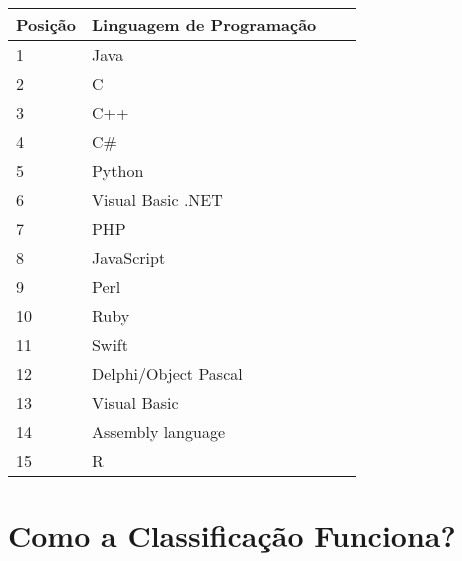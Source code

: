 \documentclass[
    12pt,               %
    openany,            %
    twoside,            %
    a4paper,            %
    brazil              %
    ]{abntex2}
\begin{document}
\begin{center}
\begin{tabular}{ | l | l | l | p{5cm} |}
\hline
Posição & Linguagem de Programação \\ \hline
1 & Java \\ \hline
2 & C \\ \hline
3 & C++ \\ \hline
4 & C\# \\ \hline
5 & Python \\ \hline
6 & Visual Basic .NET \\ \hline
7 & PHP \\ \hline
8 & JavaScript \\ \hline
9 & Perl \\ \hline
10 & Ruby \\ \hline
11 & Swift \\ \hline
12 & Delphi/Object Pascal \\ \hline
13 & Visual Basic \\ \hline
14 & Assembly language \\ \hline
15 & R \\ \hline
\end{tabular}
\end{center}

\chapter{Como a Classificação Funciona?}


\end{document}
